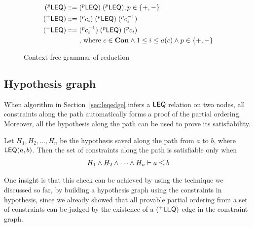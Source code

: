 \begin{figure}
\hfil
\begin{minipage}{2.3in}
\begin{align*}
(^{p}\mathsf{LEQ}) ::=\; & (^{p}\mathsf{LEQ})\; (^{p}\mathsf{LEQ}), p\in \{+,-\} \\
(^{+}\mathsf{LEQ}) ::=\; & (^{p}c_i)\; (^{p}\mathsf{LEQ})\; (^{p}c_i^{-1}) \\
(^{-}\mathsf{LEQ}) ::=\; & (^{p}c_i^{-1})\; (^{p}\mathsf{LEQ})\; (^{p}c_i) \\
     & \text{, where } c\in \mathbf{Con} \land 1 \leq i\leq a(c) \land p\in \{+,-\}\\
\end{align*}
\end{minipage}
\caption{Context-free grammar of reduction}
\label{figure:cfg}
\end{figure}

% 
\subsection{Hypothesis graph}
\label{sec:hypograph}

When algorithm in Section~\ref{sec:leqedge} infers a $\mathsf{LEQ}$ relation
on two nodes, all constraints along the path automatically forms a
proof of the partial ordering. Moreover, all the hypothesis along the
path can be used to prove its satisfiability.

Let $H_1, H_2, \dots, H_n$ be the hypothesis saved along the path from $a$ to
$b$, where $\mathsf{LEQ}(a,b)$. Then the set of constraints along the path is
satisfiable only when
\[H_1 \land H_2 \land \dots \land H_n \vdash a \leq b\]

One insight is that this check can be achieved by using the technique
we discussed so far, by building a hypothesis graph using the
constraints in hypothesis, since we already showed that all provable
partial ordering from a set of constraints can be judged by the
existence of a $(^{+}\mathsf{LEQ})$ edge in the constraint graph.


